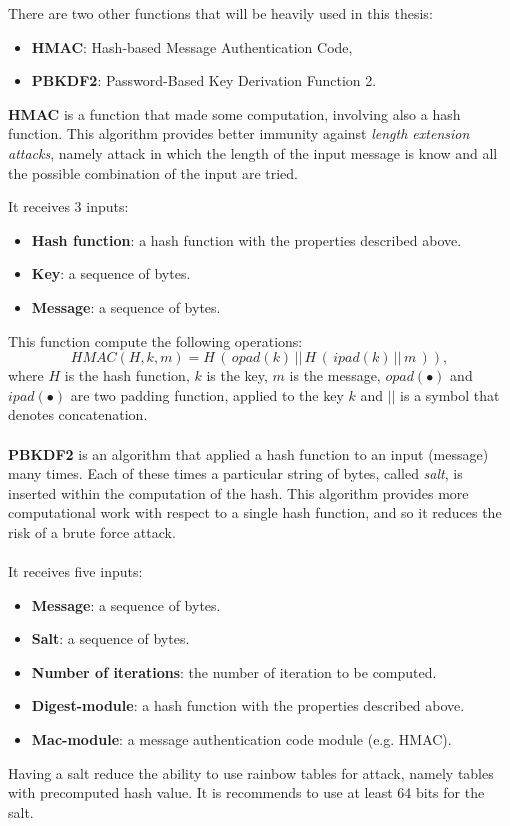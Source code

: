 There are two other functions that will be heavily used in this thesis:
\begin{itemize}
	\item \textbf{HMAC}: Hash-based Message Authentication Code,
	\item \textbf{PBKDF2}: Password-Based Key Derivation Function 2.
\end{itemize}
\begin{flushleft}
	\textbf{HMAC} is a function that made some computation, involving also a hash function. This algorithm provides better immunity against \textit{length extension attacks}, namely attack in which the length of the input message is know and all the possible combination of the input are tried.
\end{flushleft}
It receives 3 inputs:
\begin{itemize}[label=$\odot$]
	\item \textbf{Hash function}: a hash function with the properties described above.
	\item \textbf{Key}: a sequence of bytes.
	\item \textbf{Message}: a sequence of bytes.
\end{itemize}
This function compute the following operations:
\begin{equation*}
HMAC(H,k,m)=H\, (\, opad(k) \, ||\, H\, (\, ipad(k) \, ||\,  m \, )),
\end{equation*}
where $H$ is the hash function, $k$ is the key, $m$ is the message, $opad(\bullet)$ and $ipad(\bullet)$ are two padding function, applied to the key $k$ and $||$ is a symbol that denotes concatenation.
\\ \\
\textbf{PBKDF2} is an algorithm that applied a hash function to an input (message) many times. Each of these times a particular string of bytes, called \textit{salt}, is inserted within the computation of the hash. This algorithm provides more computational work with respect to a single hash function, and so it reduces the risk of a brute force attack.
\\ \\
It receives five inputs:
\begin{itemize}[label=$\odot$]
	\item \textbf{Message}: a sequence of bytes.
	\item \textbf{Salt}: a sequence of bytes.
	\item \textbf{Number of iterations}: the number of iteration to be computed.
	\item \textbf{Digest-module}: a hash function with the properties described above.
	\item \textbf{Mac-module}: a message authentication code  module (e.g. HMAC).
\end{itemize}
Having a salt reduce the ability to use rainbow tables for attack, namely tables with precomputed hash value. It is recommends to use at least 64 bits for the salt.







